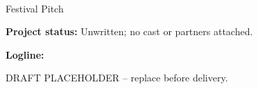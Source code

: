 \documentclass[11pt,letterpaper]{article}
\begin{document}
\begin{center}
{\Large\bfseries\sffamily \filmtitleupper}\\[6pt]
Festival Pitch
\end{center}
\textbf{Project status:} Unwritten; no cast or partners attached.

\textbf{Logline:} \filmlogline

DRAFT PLACEHOLDER -- replace before delivery.
\end{document}
